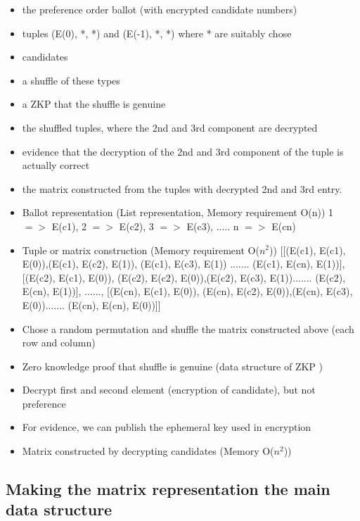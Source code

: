 \documentclass{llncs}
\begin{document}
\begin{itemize}
\item the preference order ballot (with encrypted candidate numbers)
\item tuples (E(0), *, *) and (E(-1), *, *) where * are suitably chose
\item candidates
\item a shuffle of these types
\item a ZKP that the shuffle is genuine
\item the shuffled tuples, where the 2nd and 3rd component are decrypted
\item evidence that the decryption of the 2nd and 3rd component of the
      tuple is actually correct
\item the matrix constructed from the tuples with decrypted 2nd and 3rd
      entry.
     
      
\end{itemize}
\begin{itemize}
\item Ballot representation (List representation, Memory requirement O(n))
1 $=>$ E(c1), 2 $=>$ E(c2), 3 $=>$ E(c3), ..... n $=>$ E(cn)
\item Tuple or matrix construction (Memory requirement O($n^2$)) 
[[(E(c1), E(c1), E(0)),(E(c1), E(c2), E(1)), (E(c1), E(c3), E(1)) ....... (E(c1), E(cn), E(1))], 
 [(E(c2), E(c1), E(0)), (E(c2), E(c2), E(0)),(E(c2), E(c3), E(1))....... (E(c2), E(cn), E(1))], 
 ......,
 [(E(cn), E(c1), E(0)), (E(cn), E(c2), E(0)),(E(cn), E(c3), E(0))....... (E(cn), E(cn), E(0))]]
 \item Chose a random permutation and shuffle the matrix constructed above 
 (each row and column)
 \item Zero knowledge proof that shuffle is genuine (data structure of ZKP )
 \item Decrypt first and second element (encryption of candidate), but not preference
 \item For evidence, we can publish the ephemeral key used in encryption
 \item Matrix constructed by decrypting candidates (Memory O($n^2$))
 
\end{itemize}




\subsection{Making the matrix representation the main data
structure}
\end{document}
